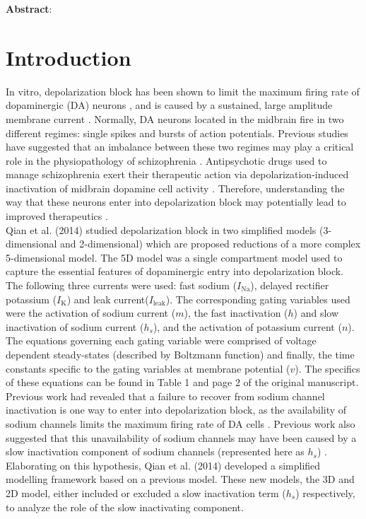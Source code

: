 
{\small \textbf{\sffamily Abstract}: \articleABSTRACT \par}

\section{Introduction}

In vitro, depolarization block has been shown to limit the maximum firing rate of dopaminergic (DA) neurons \cite{Richards1997}, and is caused by a sustained, large amplitude membrane current \cite{Bianchi2012}. Normally, DA neurons located in the midbrain fire in two different regimes: single spikes and bursts of action potentials. Previous studies have suggested that an imbalance between these two regimes may play a critical role in the physiopathology of schizophrenia \cite{Benamer2018}. Antipsychotic drugs used to manage schizophrenia exert their therapeutic action via depolarization-induced inactivation of midbrain dopamine cell activity \cite{Grace1997}. Therefore, understanding the way that these neurons enter into depolarization block may potentially lead to improved therapeutics \cite{Qian2014}.\\

Qian et al. (2014) studied depolarization block in two simplified models (3-dimensional and 2-dimensional) which are proposed reductions of a more complex 5-dimensional model. The 5D model was a single compartment model used to capture the essential features of dopaminergic entry into depolarization block. The following three currents were used: fast sodium ($I_{\text{Na}}$), delayed rectifier potassium ($I_{\text{K}}$) and leak current($I_{\text{leak}}$). The corresponding gating variables used were the activation of sodium current ($m$), the fast inactivation ($h$) and slow inactivation of sodium current ($h_s$), and the activation of potassium current ($n$). The equations governing each gating variable were comprised of voltage dependent steady-states (described by Boltzmann function) and finally, the time constants specific to the gating variables at membrane potential ($v$). The specifics of these equations can be found in Table 1 and page 2 of the original manuscript.\\

Previous work had revealed that a failure to recover from sodium channel inactivation is one way to enter into depolarization block, as the availability of sodium channels limits the maximum firing rate of DA cells \cite{Qian2014, Deister2009,Kuznetsova2010}. Previous work also suggested that this unavailability of sodium channels may have been caused by a slow inactivation component of sodium channels (represented here as $h_s$) \cite{Ding2011}. Elaborating on this hypothesis, Qian et al. (2014) developed a simplified modelling framework based on a previous model. These new models, the 3D and 2D model, either included or excluded a slow inactivation term ($h_s$) respectively, to analyze the role of the slow inactivating component.\\

